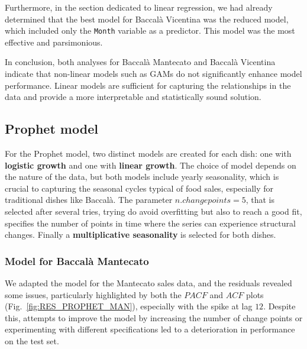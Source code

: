 \documentclass[10pt,twocolumn,letterpaper]{article}
\begin{document}
Furthermore, in the section dedicated to linear regression, we had already determined that the best model for Baccalà Vicentina was the reduced model, which included only the \texttt{Month} variable as a predictor. This model was the most effective and parsimonious.

In conclusion, both analyses for Baccalà Mantecato and Baccalà Vicentina indicate that non-linear models such as GAMs do not significantly enhance model performance. Linear models are sufficient for capturing the relationships in the data and provide a more interpretable and statistically sound solution.


\subsection{Prophet model}
For the Prophet model, two distinct models are created for each dish: one with \textbf{logistic growth} and one with \textbf{linear growth}. The choice of model depends on the nature of the data, but both models include yearly seasonality, which is crucial to capturing the seasonal cycles typical of food sales, especially for traditional dishes like Baccalà. The parameter $n.changepoints=5$, that is selected after several tries, trying do avoid overfitting but also to reach a good fit, specifies the number of points in time where the series can experience structural changes. Finally a \textbf{multiplicative seasonality} is selected for both dishes.
\subsubsection{Model for Baccalà Mantecato}
We adapted the model for the Mantecato sales data, and the residuals revealed some issues, particularly highlighted by both the $PACF$ and $ACF$ plots (Fig.~\ref{fig:RES_PROPHET_MAN}), especially with the spike at lag $12$. Despite this, attempts to improve the model by increasing the number of change points or experimenting with different specifications led to a deterioration in performance on the test set.
\end{document}
